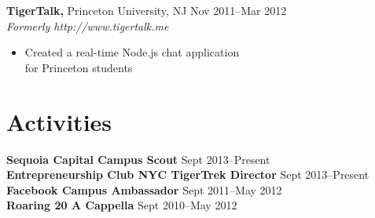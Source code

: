 \documentclass[margin]{res}
\begin{document}
\begin{resume}
 {\bf TigerTalk,} Princeton University, NJ \hfill Nov 2011--Mar 2012 \\
 {\it Formerly http://www.tigertalk.me}
 \begin{itemize} \itemsep -2pt  %
 \item Created a real-time Node.js chat application \\
   for Princeton students
 \end{itemize}

\section{Activities}
 {\bf Sequoia Capital Campus Scout} \hfill Sept 2013--Present \\
 {\bf Entrepreneurship Club NYC TigerTrek Director} \hfill Sept 2013--Present \\
 {\bf Facebook Campus Ambassador} \hfill Sept 2011--May 2012 \\
 {\bf Roaring 20 A Cappella} \hfill Sept 2010--May 2012

\end{resume}
\end{document}
